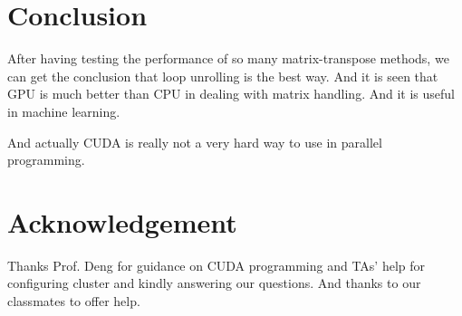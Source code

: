 \documentclass{article}
\begin{document}
\section{Conclusion}
After having testing the performance of so many matrix-transpose methods, we can get the conclusion that loop unrolling is the best way. And it is seen that GPU is much better than CPU in dealing with matrix handling. And it is useful in machine learning.

And actually CUDA is really not a very hard way to use in parallel programming.

\section{Acknowledgement}
Thanks Prof. Deng for guidance on CUDA programming and TAs' help for configuring cluster and kindly answering our questions. And thanks to our classmates to offer help.
\end{document}

